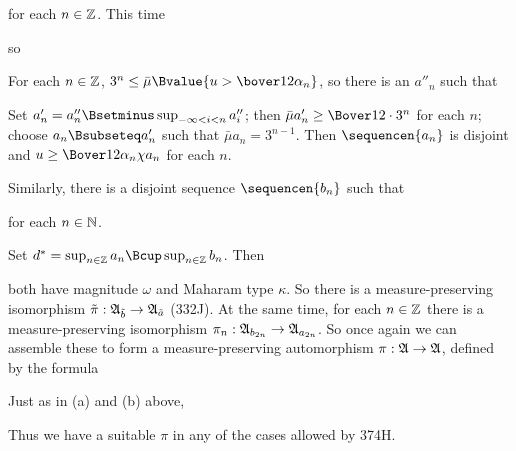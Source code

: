 {\noindent for each $n\in\Bbb Z$.   This time


\noindent so


For each $n\in\Bbb Z$, $3^n\le\bar\mu\Bvalue{u>\bover12\alpha_n}$,
so there is an $a''_n$ such that


\noindent Set
$a'_n=a''_n\Bsetminus\sup_{-\infty<i<n}a''_i$;  then
$\bar\mu a'_n\ge\Bover12\cdot 3^n$ for each $n$; choose
$a_n\Bsubseteq a'_n$ such that $\bar\mu a_n=3^{n-1}$.   Then
$\sequencen{a_n}$ is disjoint and $u\ge\Bover12\alpha_n\chi a_n$ for each
$n$.

Similarly, there is a disjoint sequence $\sequencen{b_n}$ such that


\noindent for each $n\in\Bbb N$.

Set $d^*=\sup_{n\in\Bbb Z}a_n\Bcup\sup_{n\in\Bbb Z}b_n$.   Then


\noindent both have magnitude $\omega$ and Maharam type $\kappa$.   So
there is a measure-preserving isomorphism
$\tilde\pi:\frak A_{\tilde b}\to\frak A_{\tilde a}$ (332J).
At the same time,
for each $n\in\Bbb Z$ there is a measure-preserving isomorphism
$\pi_n:\frak A_{b_{2n}}\to\frak A_{a_{2n}}$.   So once again we can
assemble these to
form a measure-preserving automorphism $\pi:\frak A\to\frak A$, defined
by the formula


Just as in (a) and (b) above,


\noindent
Thus we have a suitable $\pi$ in any of the cases allowed by 374H.
}%

